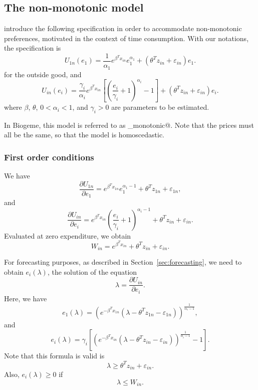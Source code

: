 \documentclass[12pt,a4paper]{article}
\begin{document}
\subsection{The non-monotonic model}

 introduce the following specification in order to accommodate non-monotonic preferences, motivated in the context of time consumption. With our notations, the specification is
\[
U_{1n}(e_1) =  \frac{1}{\alpha_1}e^{\beta^T x_{in}}e_1^{\alpha_1}+(\theta^T z_{in} + \varepsilon_{in}) e_1.
\]
for the outside good, and
\[
U_{in}(e_i) = \frac{\gamma_i}{\alpha_i} e^{\beta^T x_{in}}\left[\left(\frac{e_i}{\gamma_i}+1\right)^{\alpha_i}-1\right]+(\theta^T z_{in} + \varepsilon_{in}) e_i.
\]
where $\beta$, $\theta$, $0 < \alpha_i < 1$, and $\gamma_i > 0$  are parameters to be
estimated.

In Biogeme, this model is referred to as \lstinline@non_monotonic@.
Note that the prices must all be the same, so that the model is homoscedastic.

\subsubsection*{First order conditions}

We have
\[
\frac{\partial U_{1n}}{\partial e_1} = e^{\beta^T x_{1n}}  e_1^{\alpha_1-1} + \theta^T z_{1n} + \varepsilon_{1n},
\]
and
\[
\frac{\partial U_{in}}{\partial e_i} = e^{\beta^T x_{in}}  \left(\frac{e_i}{\gamma_i}+1\right)^{\alpha_i-1} + \theta^T z_{in} + \varepsilon_{in}.
\]
Evaluated at zero expenditure, we obtain
\[
    W_{in} = e^{\beta^T x_{in}} + \theta^T z_{in} + \varepsilon_{in}.
\]

For forecasting purposes, as described in Section~\ref{sec:forecasting}, we need to obtain $e_i(\lambda)$, the solution of the equation
\[\lambda = \frac{\partial U_{in}}{\partial e_i}. \]
Here, we have
\begin{equation}
\label{eq:expenditure_from_lambda_outside}
      e_1(\lambda) =\left(e^{-\beta^T x_{1n}}(\lambda - \theta^T z_{1n} - \varepsilon_{1n})\right)^{\frac{1}{\alpha_1-1}},
\end{equation}
and
\begin{equation}
    \label{eq:expenditure_from_lambda}
  e_i(\lambda) = \gamma_i\left[\left(e^{-\beta^T x_{in}}(\lambda -\theta^T z_{in} - \varepsilon_{in}) \right)^{\frac{1}{\alpha_i-1}}-1\right].
 \end{equation}
Note that this formula is valid is
\[
    \lambda \geq \theta^T z_{in}+\varepsilon_{in}.
\]
Also, $e_i(\lambda) \geq 0$ if
\[
    \lambda \leq W_{in}.
\]
\end{document}
